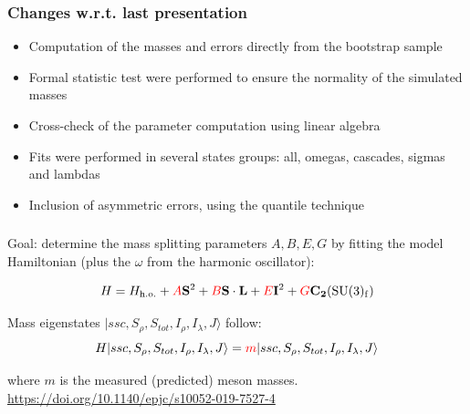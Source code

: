 \documentclass[10pt]{beamer}
\begin{document}
\begin{frame}
\frametitle{Changes w.r.t. last presentation}
\begin{beamerboxesrounded}[upper=uppercolor, lower=lowercolor, shadow=true]{} 
\begin{itemize}

\item Computation of the masses and errors directly from the bootstrap sample
\item Formal statistic test were performed to ensure the normality of the simulated masses
\item Cross-check of the parameter computation using linear algebra
\item Fits were performed in several states groups: all, omegas, cascades, sigmas and lambdas
\item Inclusion of asymmetric errors, using the quantile technique

\end{itemize}
\end{beamerboxesrounded}

\end{frame}



\begin{frame}
\frametitle{}
Goal: determine the mass splitting parameters $A,B,E,G$ by fitting the model Hamiltonian (plus the $\omega$ from the harmonic oscillator):

\begin{equation}
H = H_{\mathrm{h.o.}} + \textcolor{red}{A}\mathbf{S}^{2} + \textcolor{red}{B}\mathbf{S\cdot L} +  \textcolor{red}{E}\mathbf{I}^{2} + \textcolor{red}{G}\mathbf{C_{2}}(\mathrm{SU(3)_{f}})
\end{equation}

\vspace{10mm}
Mass eigenstates $\vert ssc,S_{\rho},S_{tot},I_{\rho},I_{\lambda},J \rangle$ follow:
\begin{equation}
H \vert ssc,S_{\rho},S_{tot},I_{\rho},I_{\lambda},J \rangle = \textcolor{red}{m}\vert ssc,S_{\rho},S_{tot},I_{\rho},I_{\lambda},J \rangle
\end{equation}

where $m$ is the measured (predicted) meson masses.
\vspace{5mm}
\url{https://doi.org/10.1140/epjc/s10052-019-7527-4}

\end{frame}
\end{document}
